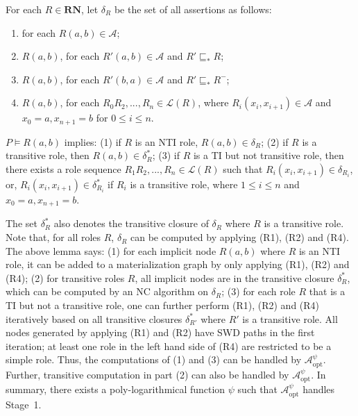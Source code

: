 \begin{definition}\label{def:deltaRdhlplus}
For each $R\in\textbf{RN}$, let $\delta_R$ be the set of all assertions as follows:
\begin{enumerate}[leftmargin=4ex,label=\arabic*.]
\item for each $R(a,b)\in\mathcal{A}$;
\item $R(a,b)$, for each $R'(a,b)\in\mathcal{A}$ and $R'\sqsubseteq_{*}R$;
\item $R(a,b)$, for each $R'(b,a)\in\mathcal{A}$ and $R'\sqsubseteq_{*}R^-$;
\item $R(a,b)$, for each $R_0R_2,...,R_n\in\mathcal{L}(R)$, where $R_i(x_i,x_{i+1})\in\mathcal{A}$ and $x_0=a, x_{n+1}=b$ for $0\leq i\leq n$.
\end{enumerate}
\end{definition}

\begin{lemma}\label{lemma:tiplus}
$P\models R(a,b)$ implies: (1) if $R$ is an NTI role, $R(a,b)\in\delta_R$;
(2) if $R$ is a transitive role, then $R(a,b)\in\delta^*_R$;
(3) if $R$ is a TI but not transitive role, then there exists a role sequence $R_1R_2,...,R_n\in\mathcal{L}(R)$ such that
$R_i(x_i,x_{i+1})\in\delta_{R_i}$, or, $R_i(x_i,x_{i+1})\in\delta^*_{R_i}$ if $R_i$ is a transitive role,
where $1\leq i\leq n$ and $x_0=a, x_{n+1}=b$.
\end{lemma}

The set $\delta^*_R$ also denotes the transitive closure of $\delta_R$ where $R$ is a transitive role.
Note that, for all roles $R$, $\delta_R$ can be computed by applying (R1), (R2) and (R4).
The above lemma says:
(1) for each implicit node $R(a,b)$ where $R$ is an NTI role,
it can be added to a materialization graph by only applying (R1), (R2) and (R4);
(2) for transitive roles $R$, all implicit nodes are in the transitive closure $\delta^*_{R}$,
which can be computed by an NC algorithm on $\delta_{R}$;
(3) for each role $R$ that is a TI but not a transitive role,
one can further perform (R1), (R2) and (R4) iteratively based on all
transitive closures $\delta^*_{R'}$ where $R'$ is a transitive role.
All nodes generated by applying (R1) and (R2) have SWD paths in the first iteration; at
least one role in the left hand side of (R4) are restricted to be a simple role.
Thus, the computations of (1) and (3) can be handled by $\mathcal{A}_{\text{opt}}^\psi$.
Further, transitive computation in part (2) can also be handled by $\mathcal{A}_{\text{opt}}^\psi$.
In summary, there exists a poly-logarithmical function $\psi$
such that $\mathcal{A}_{\text{opt}}^\psi$ handles Stage~1.

